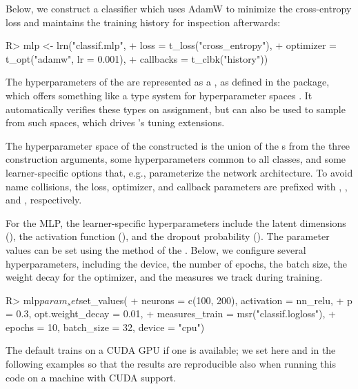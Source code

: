 \documentclass[article,shortnames]{jss}
\theoremstyle{definition}
\renewenvironment{CodeChunk}{\par\addvspace{0.6\baselineskip}\noindent\begin{minipage}{\linewidth}}{\end{minipage}\par\vspace{0.6\baselineskip}}
\begin{document}
Below, we construct a  classifier which uses AdamW \citep{ref-loshchilov2017decoupled} to minimize the cross-entropy loss and maintains the training history for inspection afterwards:

\begin{CodeChunk}
\begin{CodeInput}
R> mlp <- lrn("classif.mlp",
+    loss = t_loss("cross_entropy"),
+    optimizer = t_opt("adamw", lr = 0.001),
+    callbacks = t_clbk("history"))
\end{CodeInput}
\end{CodeChunk}

The hyperparameters of the  are represented as a , as defined in the  package, which offers something like a type system for hyperparameter spaces \citep{ref-paradox2024}.
It automatically verifies these types on assignment, but can also be used to sample from such spaces, which drives \mlrt{}'s tuning extensions.

The hyperparameter space of the constructed  is the union of the s from the three construction arguments, some hyperparameters common to all  classes, and some learner-specific options that, e.g., parameterize the network architecture.
To avoid name collisions, the loss, optimizer, and callback parameters are prefixed with , , and , respectively.

For the MLP, the learner-specific hyperparameters include the latent dimensions (), the activation function (), and the dropout probability ().
The parameter values can be set using the  method of the .
Below, we configure several hyperparameters, including the device, the number of epochs, the batch size, the weight decay for the optimizer, and the measures we track during training.

\begin{CodeChunk}
\begin{CodeInput}
R> mlp$param_set$set_values(
+    neurons = c(100, 200), activation = nn_relu,
+    p = 0.3, opt.weight_decay = 0.01,
+    measures_train = msr("classif.logloss"),
+    epochs = 10, batch_size = 32, device = "cpu")
\end{CodeInput}
\end{CodeChunk}

The default  trains on a CUDA GPU if one is available; we set  here and in the following examples so that the results are reproducible also when running this code on a machine with CUDA support.
\end{document}
